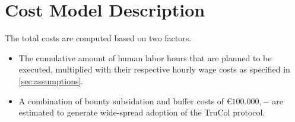 \section{Cost Model Description}\label{sec:model_description}
The total costs are computed based on two factors.
\begin{itemize}
	\item The cumulative amount of human labor hours that are planned to be executed, multiplied with their respective hourly wage costs as specified in \cref{sec:assumptions}. 
	\item A combination of bounty subsidation and buffer costs of \euro$100.000,-$ are estimated to generate wide-spread adoption of the TruCol protocol.
\end{itemize}